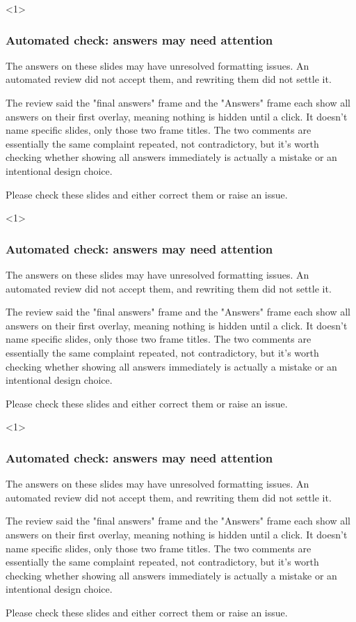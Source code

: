 \documentclass{beamer}
\begin{document}
\begin{frame}<1>
\frametitle{Automated check: answers may need attention}
The answers on these slides may have unresolved formatting issues. An automated
review did not accept them, and rewriting them did not settle it.

The review said the "final answers" frame and the "Answers" frame each show all answers on their first overlay, meaning nothing is hidden until a click. It doesn't name specific slides, only those two frame titles. The two comments are essentially the same complaint repeated, not contradictory, but it's worth checking whether showing all answers immediately is actually a mistake or an intentional design choice.

Please check these slides and either correct them or raise an issue.
\end{frame}
\begin{frame}<1>
\frametitle{Automated check: answers may need attention}
The answers on these slides may have unresolved formatting issues. An automated
review did not accept them, and rewriting them did not settle it.

The review said the "final answers" frame and the "Answers" frame each show all answers on their first overlay, meaning nothing is hidden until a click. It doesn't name specific slides, only those two frame titles. The two comments are essentially the same complaint repeated, not contradictory, but it's worth checking whether showing all answers immediately is actually a mistake or an intentional design choice.

Please check these slides and either correct them or raise an issue.
\end{frame}
\begin{frame}<1>
\frametitle{Automated check: answers may need attention}
The answers on these slides may have unresolved formatting issues. An automated
review did not accept them, and rewriting them did not settle it.

The review said the "final answers" frame and the "Answers" frame each show all answers on their first overlay, meaning nothing is hidden until a click. It doesn't name specific slides, only those two frame titles. The two comments are essentially the same complaint repeated, not contradictory, but it's worth checking whether showing all answers immediately is actually a mistake or an intentional design choice.

Please check these slides and either correct them or raise an issue.
\end{frame}
\end{document}
